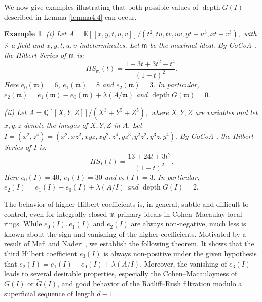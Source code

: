 \documentclass[11pt]{amsart}
\theoremstyle{plain}
\newtheorem{example}[theorem]{Example}
\newcommand{\m}{\mathfrak{m}}
\newcommand{\wt}{\widetilde}
\newcommand{\depth}{\operatorname{depth}}
\theoremstyle{plain}
\begin{document}
We now give examples illustrating that both possible values of $\depth G(I)$ described in Lemma \ref{lemma4.4} can occur.

\begin{example} \normalfont
(i)  \cite[Example 3.10]{corso2005depth}Let $A=\mathbb{K}[[x,y,t,u,v]]/(t^2,tu,tv,uv,yt-u^3,xt-v^3),$ with $\mathbb{K}$ a field and $x,y,t,u,v$ indeterminates. Let $\m$ be the maximal ideal.  By CoCoA \cite{cocoa}, the Hilbert Series of $\m$ is:
        \begin{equation*}
            HS_{\m}(t)=\frac{1+3t+3t^2-t^4}{(1-t)^2}.
        \end{equation*}
        Here $e_{0}(\m)=6$, $e_{1}(\m)=8$ and $e_{2}(\m)=3.$ In particular,  $e_{2}(\m)=e_{1}(\m)-e_{0}(\m)+\lambda(A/\m)$ and  $\depth G(\m)=0.$ 

        \noindent (ii) Let $A=\mathbb Q[[X,Y,Z]]/(X^3+Y^5+Z^5),$  where $X,Y,Z$ are variables and   let $x,y,z$ denote the images of $X,Y,Z$ in $A.$ Let $I= \overline{(x^2,z^4)}=(x^2,xz^2,xyz,xy^2,z^4,yz^3,y^2z^2,y^3z,y^4).$ By CoCoA \cite{cocoa}, the Hilbert Series of $I$ is:
        \begin{equation*}
            HS_{I}(t)=\frac{13+24t+3t^2}{(1-t)^2}.
        \end{equation*}
       Here $e_{0}(I)=40$, $e_{1}(I)=30$ and $e_{2}(I)=3.$ In particular,  $e_{2}(I)=e_{1}(I)-e_{0}(I)+\lambda(A/I)$ and $ \depth G(I)=2.$
\end{example}




The behavior of higher Hilbert coefficients is, in general, subtle and difficult to control, even for integrally closed $\m$-primary ideals in Cohen–Macaulay local rings. While $e_{0}(I), e_{1}(I)$ and $e_{2}(I)$ are always non-negative, much less is known about the sign and vanishing of the higher coefficients. Motivated by a result of Mafi and Naderi \cite[Theorem 2,8]{mafi},  we establish the following theorem. It shows that the third Hilbert coefficient $e_3(I)$ is always non-positive under the given hypothesis that $e_{2}(I)=e_{1}(I)-e_{0}(I)+\lambda(A/I)$. Moreover, the vanishing of $e_3(I)$ leads to several desirable properties, especially the Cohen–Macaulayness of $G(I)$ or $\wt{G}(I)$, and good behavior of the Ratliff–Rush filtration modulo a superficial sequence of length $d-1$.
\end{document}
